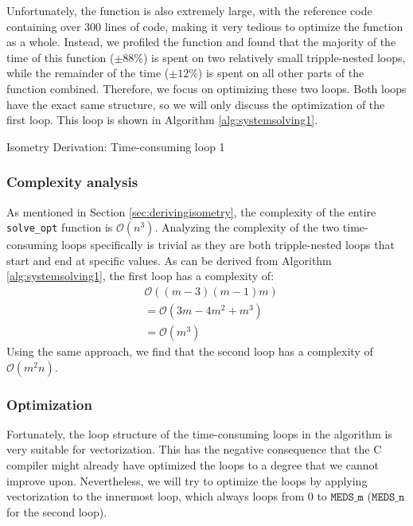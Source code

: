 \documentclass[11pt,a4paper]{report}
\theoremstyle{definition}
\begin{document}
Unfortunately, the function is also extremely large, with the reference code containing over 300 lines of code, making it very tedious to optimize the function as a whole. Instead, we profiled the function and found that the majority of the time of this function ($\pm 88 \%$) is spent on two relatively small tripple-nested loops, while the remainder of the time ($\pm 12 \%$) is spent on all other parts of the function combined. Therefore, we focus on optimizing these two loops. Both loops have the exact same structure, so we will only discuss the optimization of the first loop. This loop is shown in Algorithm \ref{alg:systemsolving1}.

\begin{algorithm}
  \caption{Isometry Derivation: Time-consuming loop 1}
  \label{alg:systemsolving1}
  
\end{algorithm}

\subsubsection{Complexity analysis}
\label{sec:isometryderivationcomplexity}
As mentioned in Section \ref{sec:derivingisometry}, the complexity of the entire \texttt{solve\_opt} function is $\mathcal{O}(n^3)$. Analyzing the complexity of the two time-consuming loops specifically is trivial as they are both tripple-nested loops that start and end at specific values. As can be derived from Algorithm \ref{alg:systemsolving1}, the first loop has a complexity of:
\begin{align*}
  & \mathcal{O}((m-3)(m-1)m) \\
  & = \mathcal{O}(3m - 4m^2 + m^3) \\
  & = \mathcal{O}(m^3)
\end{align*}
Using the same approach, we find that the second loop has a complexity of $\mathcal{O}(m^2n)$.

\subsubsection{Optimization}
\label{sec:isometryderivationoptimization}
Fortunately, the loop structure of the time-consuming loops in the algorithm is very suitable for vectorization. This has the negative consequence that the C compiler might already have optimized the loops to a degree that we cannot improve upon. Nevertheless, we will try to optimize the loops by applying vectorization to the innermost loop, which always loops from $0$ to $\texttt{MEDS\_m}$ ($\texttt{MEDS\_n}$ for the second loop).
\end{document}
